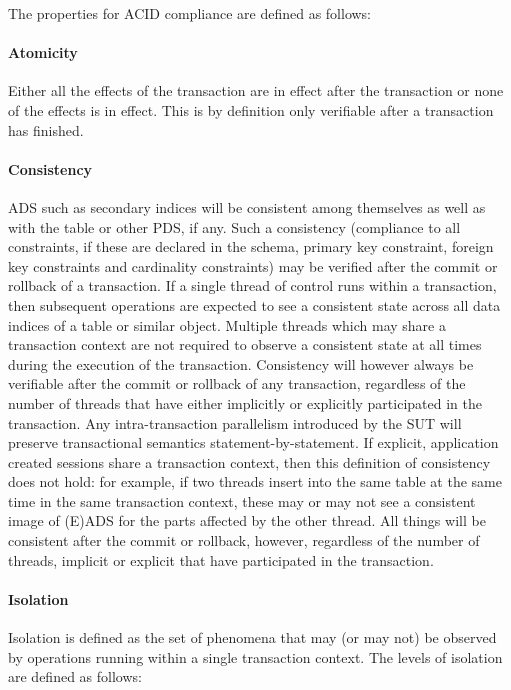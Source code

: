 The properties for ACID compliance are defined as follows:

\paragraph{Atomicity}
Either all the effects of the transaction are in effect after the transaction or none of the effects
is in effect. This is by definition only verifiable after a transaction has finished.

\paragraph{Consistency}
ADS such as secondary indices will be consistent among themselves as well as with the table or other PDS, if any. Such a consistency (compliance to all constraints, if these are declared in the schema, \eg primary key constraint, foreign key constraints and cardinality constraints) may be verified
after the commit or rollback of a transaction. If a single thread of control runs within a transaction, then
subsequent operations are expected to see a consistent state across all data indices of a table
or similar object. Multiple threads which may share a transaction context are not required to observe a
consistent state at all times during the execution of the transaction. Consistency will however always be
verifiable after the commit or rollback of any transaction, regardless of the number of threads that have
either implicitly or explicitly participated in the transaction. Any intra-transaction parallelism introduced
by the SUT will preserve transactional semantics statement-by-statement. If explicit, application created
sessions share a transaction context, then this definition of consistency does not hold: for example, if
two threads insert into the same table at the same time in the same transaction context, these may or may
not see a consistent image of (E)ADS for the parts affected by the other thread. All things will be
consistent after the commit or rollback, however, regardless of the number of threads, implicit or explicit
that have participated in the transaction.

\paragraph{Isolation}
Isolation is defined as the set of phenomena that may (or may not) be observed by operations running within a single transaction context. The levels of isolation are defined as follows:

